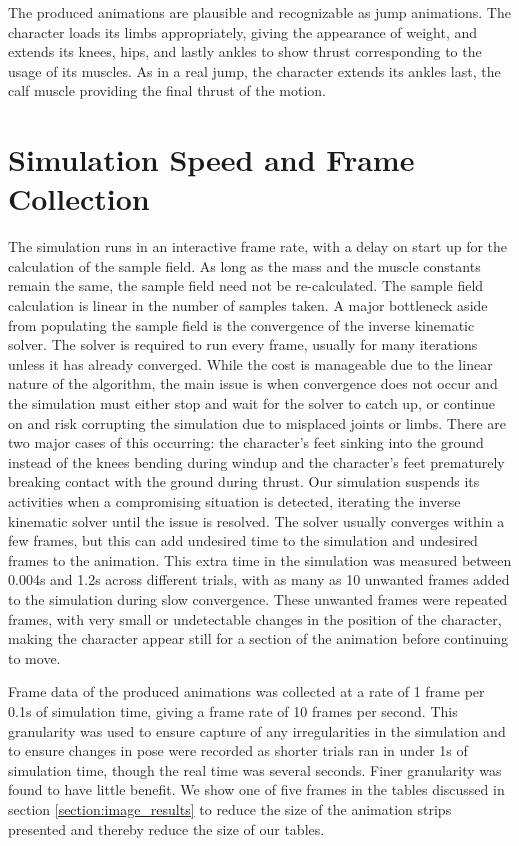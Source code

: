 The produced animations are plausible and recognizable as jump animations.  The character loads its limbs appropriately, giving the appearance of weight, and extends its knees, hips, and lastly ankles to show thrust corresponding to the usage of its muscles.  As in a real jump, the character extends its ankles last, the calf muscle providing the final thrust of the motion.


\section{Simulation Speed and Frame Collection}
\label{section:speed_frame_results}
The simulation runs in an interactive frame rate, with a delay on start up for the calculation of the sample field.  As long as the mass and the muscle constants remain the same, the sample field need not be re-calculated.  The sample field calculation is linear in the number of samples taken.  A major bottleneck aside from populating the sample field is the convergence of the inverse kinematic solver.  The solver is required to run every frame, usually for many iterations unless it has already converged.  While the cost is manageable due to the linear nature of the algorithm, the main issue is when convergence does not occur and the simulation must either stop and wait for the solver to catch up, or continue on and risk corrupting the simulation due to misplaced joints or limbs.  There are two major cases of this occurring: the character's feet sinking into the ground instead of the knees bending during windup and the character's feet prematurely breaking contact with the ground during thrust.  Our simulation suspends its activities when a compromising situation is detected, iterating the inverse kinematic solver until the issue is resolved.  The solver usually converges within a few frames, but this can add undesired time to the simulation and undesired frames to the animation.  This extra time in the simulation was measured between 0.004s and 1.2s across different trials, with as many as 10 unwanted frames added to the simulation during slow convergence.  These unwanted frames were repeated frames, with very small or undetectable changes in the position of the character, making the character appear still for a section of the animation before continuing to move.

Frame data of the produced animations was collected at a rate of 1 frame per 0.1s of simulation time, giving a frame rate of 10 frames per second.  This granularity was used to ensure capture of any irregularities in the simulation and to ensure changes in pose were recorded as shorter trials ran in under 1s of simulation time, though the real time was several seconds.  Finer granularity was found to have little benefit.  We show one of five frames in the tables discussed in section \ref{section:image_results} to reduce the size of the animation strips presented and thereby reduce the size of our tables.

